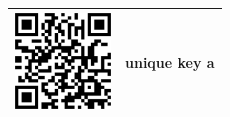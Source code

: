 \documentclass{article}
\begin{document}
\renewcommand\arraystretch{0}
\renewcommand\tabcolsep{0pt}

\begin{table}
\begin{tabular}{p{1in} | >{\centering\arraybackslash}m{1.65in} |}
\hline%
\includegraphics[width=1in,height=1in]{600px-QR_code_Wikimedia_Commons_(URL).png} 
& unique key a 
\\ \hline
\end{tabular}
\end{table}
\end{document}
